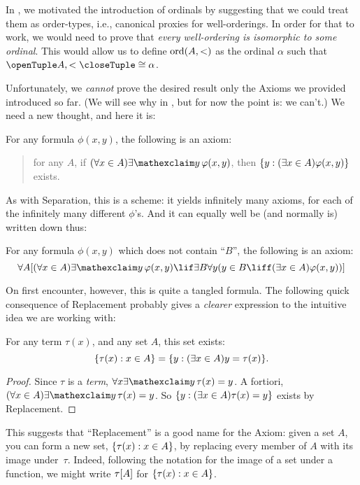 \documentclass[../../../include/open-logic-section]{subfiles}
\begin{document}

In , we motivated the introduction of ordinals by
suggesting that we could treat them as order-types, i.e., canonical
proxies for well-orderings. In order for that to work, we would need
to prove that \emph{every well-ordering is isomorphic to some
ordinal}. This would allow us to define $\mathrm{ord}(A, <)$ as the
ordinal $\alpha$ such that $\tuple{A, <} \isomorphic \alpha$. 

Unfortunately, we \emph{cannot} prove the desired result only the
Axioms we provided introduced so far. (We will see why in
, but for now the point is: we can't.) We need a
new thought, and here it is:

\begin{axiom}
For any formula $\phi(x, y)$, the following is an axiom:
\begin{quote}
	for any $A$, if $(\forall x \in A)\lexists![y][\phi(x,y)]$, then
	$\{ y : (\exists x \in A)\varphi(x,y) \}$ exists.
\end{quote}
\end{axiom}
\noindent
As with Separation, this is a scheme: it yields infinitely many
axioms, for each of the infinitely many different $\phi$'s. And it can
equally well be (and normally is) written down thus:

\begin{defish}
For any formula $\phi(x,y)$ which does not contain ``$B$'', the following is an axiom:
\[
\forall A[(\forall x \in A)\lexists![y][\phi(x,y)] \lif \exists B\forall y (y \in B \liff (\exists x \in A)\phi(x,y))]
\]
\end{defish}

On first encounter, however, this is quite a tangled formula. The
following quick consequence of Replacement probably gives a
\emph{clearer} expression to the intuitive idea we are working with:

\begin{cor}
For any term $\tau(x)$, and any set $A$, this set exists:
\[
	\{ \tau(x) : x \in A \} = \{ y : (\exists x \in A)y = \tau(x) \}.
\]
\end{cor}

\begin{proof}
Since $\tau$ is a \emph{term}, $\forall x \lexists![y][\tau(x) = y]$.
A fortiori, $(\forall x \in A)\lexists![y][\tau(x) = y]$. So
$\{ y : (\exists x \in A)\tau(x) = y \}$ exists by Replacement.
\end{proof}
\noindent
This suggests that ``Replacement'' is a good name for the Axiom: given
a set $A$, you can form a new set, $\{ \tau(x) : x \in A \}$, by
replacing every member of $A$ with its image under~$\tau$. Indeed,
following the notation for the image of a set under a function, we
might write $\tau[A]$ for $\{ \tau(x) : x \in A \}$.
\end{document}
